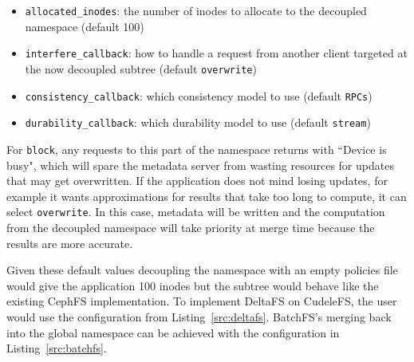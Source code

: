 \begin{itemize}

  \item \texttt{allocated\_inodes}: the number of inodes to allocate to the
  decoupled namespace (default 100)

  \item \texttt{interfere\_callback}: how to handle a request from another
  client targeted at the now decoupled subtree (default \texttt{overwrite})

  \item \texttt{consistency\_callback}: which consistency model to use (default
  \texttt{RPCs})

  \item \texttt{durability\_callback}: which durability model to use (default
  \texttt{stream})

\end{itemize}

For \texttt{block}, any requests to this part of the namespace returns with
``Device is busy", which will spare the metadata server from wasting resources
for updates that may get overwritten. If the application does not mind losing
updates, for example it wants approximations for results that take too long to
compute, it can select \texttt{overwrite}. In this case, metadata will be
written and the computation from the decoupled namespace will take priority at
merge time because the results are more accurate.

Given these default values decoupling the namespace with an empty policies file
would give the application 100 inodes but the subtree would behave like the
existing CephFS implementation. To implement DeltaFS on CudeleFS, the user
would use the configuration from Listing~\ref{src:deltafs}. BatchFS's merging
back into the global namespace can be achieved with the configuration in
Listing~\ref{src:batchfs}.

